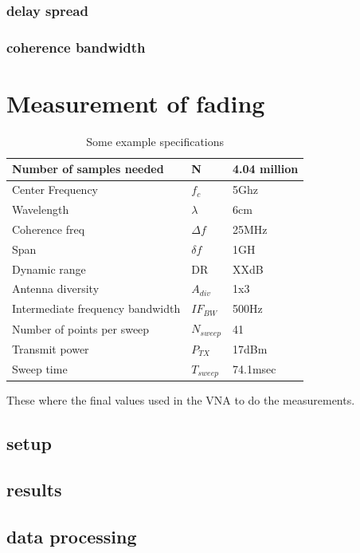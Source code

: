 \subsection{delay spread}
\subsection{coherence bandwidth}

\chapter{Measurement of fading}
\begin{table}[H]
\centering
\caption{Some example specifications}
\label{final_specs}
\begin{tabular}{|l|l|l|}
\hline
Number of samples needed         & N           & 4.04 million         \\ \hline
Center Frequency                 & $f_c$       & 5Ghz             \\ \hline
Wavelength                       & $\lambda$   & 6cm           \\ \hline
Coherence freq                   & $\Delta f$  & 25MHz           \\ \hline
Span & $\delta f$ & 1GH \\ \hline
Dynamic range                    & DR          & XXdB            \\ \hline
Antenna diversity                & $A_{div}$   & 1x3                    \\ \hline
Intermediate frequency bandwidth & $IF_{BW}$     & 500Hz          \\ \hline
Number of points per sweep & $N_{sweep}$ & 41 \\ \hline
Transmit power & $P_{TX}$ & 17dBm \\ \hline
Sweep time & $T_{sweep}$ &74.1msec \\ \hline
\end{tabular}
\end{table}
These where the final values used in the VNA to do the measurements.
\section{setup}
\section{results}
\section{data processing}
